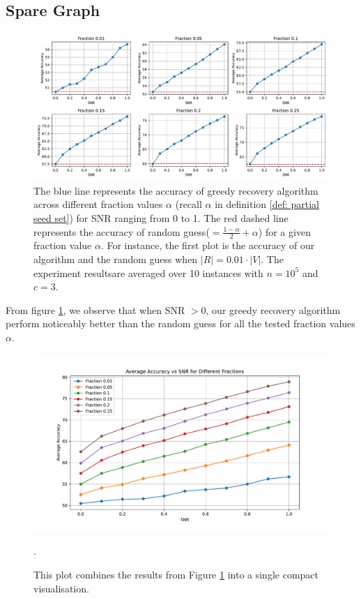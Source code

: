 \subsection{Spare Graph}
\begin{figure}[H]
    \centering
    \includegraphics[width=1\linewidth]{Figures/Greedy_Recovery_Sparse_50000_1.pdf}
    \caption[Accuracy of Greedy Recovery Algorithm in Sparse Graph with $k=2$]{The blue line represents the accuracy of greedy recovery algorithm across different fraction values $\alpha$ (recall $\alpha$ in definition \ref{def: partial seed set}) for SNR ranging from 0 to 1. The red dashed line represents the accuracy of random guess($=\frac{1-\alpha}{2}+\alpha$) for a given fraction value $\alpha$. For instance, the first plot is the accuracy of our algorithm and the random guess when $|R|=0.01\cdot|V|.$ The experiment results\protect\footnotemark are averaged over 10 instances with $n=10^5$ and $c=3.$}
    \label{fig:greedy_sparse}
\end{figure}
From figure \ref{fig:greedy_sparse}, we observe that when SNR $>0$, our greedy recovery algorithm perform noticeably better than the random guess  for all the tested fraction values $\alpha.$\\
\begin{figure}[ht]
    \centering
    \includegraphics[width=1\linewidth]{Figures/Greedy_Recovery_Sparse_50000_2.pdf}
    \caption[A Compact Version of Accuracy Plot]{This plot combines the results from Figure \ref{fig:greedy_sparse} into a single compact visualisation.}.
    \label{fig: compact_sparse}
\end{figure}

